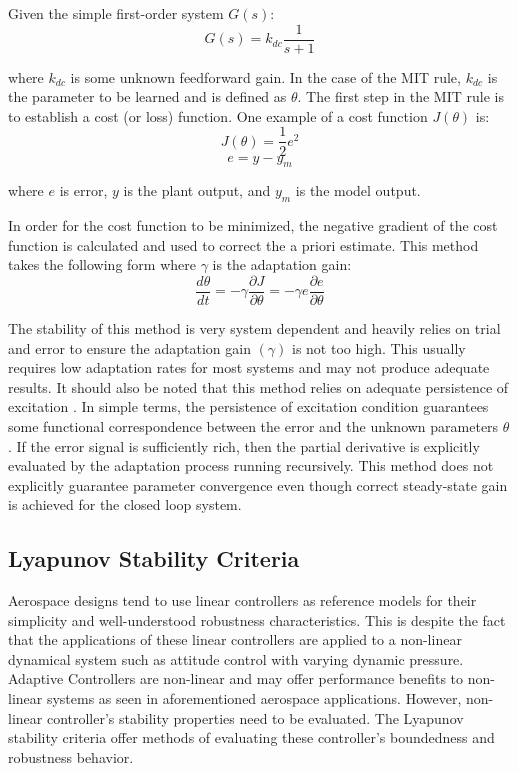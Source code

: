 Given the simple first-order system $G(s)$:
\begin{equation}
G(s) = k_{dc}\frac{1}{s+1}
\end{equation}

where $k_{dc}$ is some unknown feedforward gain.  In the case of the MIT rule, $k_{dc}$ is the parameter to be learned and is defined as $\theta$.  The first step in the MIT rule is to establish a cost (or loss) function.  One example of a cost function $J(\theta)$ is:
\begin{equation}
J(\theta) = \frac{1}{2}e^2
\end{equation}
\begin{equation}
e=y-y_m
\end{equation}

where $e$ is error, $y$ is the plant output, and $y_m$ is the model output.

In order for the cost function to be minimized, the negative gradient of the cost function is calculated and used to correct the a priori estimate.  This method takes the following form where $\gamma$ is the adaptation gain:
\begin{equation}
\frac{d\theta}{dt}=-\gamma \frac{\partial{J}}{\partial{\theta}} =-\gamma e\frac{\partial{e}}{\partial{\theta}}
\end{equation}

The stability of this method is very system dependent and heavily relies on trial and error to ensure the adaptation gain $(\gamma)$ is not too high.  This usually requires low adaptation rates for most systems and may not produce adequate results.  It should also be noted that this method relies on adequate persistence of excitation \cite{aastrom2013adaptive}.  In simple terms, the persistence of excitation condition guarantees some functional correspondence between the error and the unknown parameters $\theta$. If the error signal is sufficiently rich, then the partial derivative is explicitly evaluated by the adaptation process running recursively.  This method does not explicitly guarantee parameter convergence even though correct steady-state gain is achieved for the closed loop system.

\subsection{Lyapunov Stability Criteria}

Aerospace designs tend to use linear controllers as reference models for their simplicity and well-understood robustness characteristics.  This is despite the fact that the applications of these linear controllers are applied to a non-linear dynamical system such as attitude control with varying dynamic pressure.  Adaptive Controllers are non-linear and may offer performance benefits to non-linear systems as seen in aforementioned aerospace applications.  However, non-linear controller's stability properties need to be evaluated.  The Lyapunov stability criteria offer methods of evaluating these controller's boundedness and robustness behavior.

